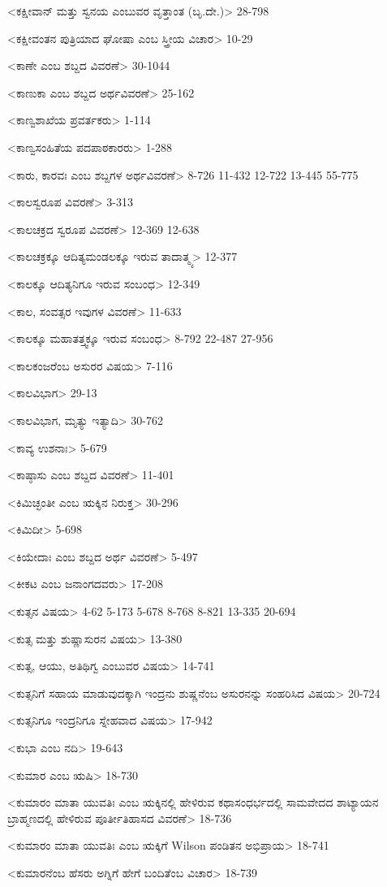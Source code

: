 <ಕಕ್ಷೀವಾನ್‍ ಮತ್ತು ಸ್ವನಯ ಎಂಬುವರ ವೃತ್ತಾಂತ (ಬೃ.ದೇ.)>
28-798

<ಕಕ್ಷೀವಂತನ ಪುತ್ರಿಯಾದ ಘೋಷಾ ಎಂಬ ಸ್ತ್ರೀಯ ವಿಚಾರ>
10-29

<ಕಾಣೇ ಎಂಬ ಶಬ್ದದ ವಿವರಣೆ>
30-1044

<ಕಾಣುಕಾ ಎಂಬ ಶಬ್ದದ ಅರ್ಥವಿವರಣೆ>
25-162

<ಕಾಣ್ವಶಾಖೆಯ ಪ್ರವರ್ತಕರು>
1-114

<ಕಾಣ್ವಸಂಹಿತೆಯ ಪದಪಾಠಕಾರರು>
1-288

<ಕಾರು, ಕಾರವಃ ಎಂಬ ಶಬ್ದಗಳ ಅರ್ಥವಿವರಣೆ>
8-726 
11-432 
12-722 
13-445
55-775

<ಕಾಲಸ್ವರೂಪ ವಿವರಣೆ>
3-313

<ಕಾಲಚಕ್ರದ ಸ್ವರೂಪ ವಿವರಣೆ>
12-369
12-638

<ಕಾಲಚಕ್ರಕ್ಕೂ ಆದಿತ್ಯಮಂಡಲಕ್ಕೂ ಇರುವ ತಾದಾತ್ಮ್ಯ>
12-377

<ಕಾಲಕ್ಕೂ ಆದಿತ್ಯನಿಗೂ ಇರುವ ಸಂಬಂಧ>
12-349

<ಕಾಲ, ಸಂವತ್ಸರ ಇವುಗಳ ವಿವರಣೆ>
11-633

<ಕಾಲಕ್ಕೂ ಮಹಾತತ್ತ್ವಕ್ಕೂ ಇರುವ ಸಂಬಂಧ>
8-792 
22-487
27-956

<ಕಾಲಕಂಜರೆಂಬ ಅಸುರರ ವಿಷಯ>
7-116

<ಕಾಲವಿಭಾಗ>
29-13

<ಕಾಲವಿಭಾಗ, ಮೃತ್ಯು ಇತ್ಯಾದಿ>
30-762

<ಕಾವ್ಯ ಉಶನಾಃ>
5-679

<ಕಾಷ್ಠಾಸು ಎಂಬ ಶಬ್ದದ ವಿವರಣೆ>
11-401

<ಕಿಮಿಚ್ಛಂತೀ ಎಂಬ ಋಕ್ಕಿನ ನಿರುಕ್ತ>
30-296

<ಕಿಮಿದೀ>
5-698

<ಕಿಯೇದಾಃ ಎಂಬ ಶಬ್ದದ ಅರ್ಥ ವಿವರಣೆ>
5-497

<ಕೀಕಟ ಎಂಬ ಜನಾಂಗದವರು>
17-208

<ಕುತ್ಸನ ವಿಷಯ>
4-62 
5-173 
5-678 
8-768 
8-821 
13-335
20-694

<ಕುತ್ಸ ಮತ್ತು ಶುಷ್ಣಾಸುರನ ವಿಷಯ>
13-380

<ಕುತ್ಸ, ಆಯು, ಅತಿಥಿಗ್ವ ಎಂಬುವರ ವಿಷಯ>
14-741

<ಕುತ್ಸನಿಗೆ ಸಹಾಯ ಮಾಡುವುದಕ್ಕಾಗಿ ಇಂದ್ರನು ಶುಷ್ಣನೆಂಬ ಅಸುರನನ್ನು ಸಂಹರಿಸಿದ ವಿಷಯ>
20-724

<ಕುತ್ಸನಿಗೂ ಇಂದ್ರನಿಗೂ ಸ್ನೇಹವಾದ ವಿಷಯ>
17-942

<ಕುಭಾ ಎಂಬ ನದಿ>
19-643

<ಕುಮಾರ ಎಂಬ ಋಷಿ>
18-730


<ಕುಮಾರಂ ಮಾತಾ ಯುವತಿಃ ಎಂಬ ಋಕ್ಕಿನಲ್ಲಿ ಹೇಳಿರುವ ಕಥಾಸಂಧರ್ಭದಲ್ಲಿ ಸಾಮವೇದದ ಶಾಟ್ಯಾಯನ ಬ್ರಾಹ್ಮಣದಲ್ಲಿ ಹೇಳಿರುವ ಪೂರ್ತೀತಿಹಾಸದ ವಿವರಣೆ>
18-736

<ಕುಮಾರಂ ಮಾತಾ ಯುವತಿಃ ಎಂಬ ಋಕ್ಕಿಗೆ Wilson ಪಂಡಿತನ ಅಭಿಪ್ರಾಯ>
18-741

<ಕುಮಾರನೆಂಬ ಹೆಸರು ಅಗ್ನಿಗೆ ಹೇಗೆ ಬಂದಿತೆಂಬ ವಿಚಾರ>
18-739

